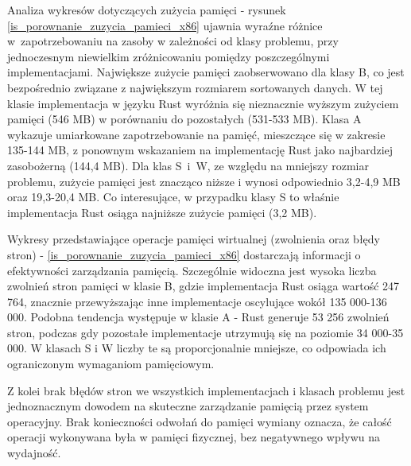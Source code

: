 Analiza wykresów dotyczących zużycia pamięci - rysunek \ref{is_porownanie_zuzycia_pamieci_x86} ujawnia wyraźne różnice w~zapotrzebowaniu na zasoby w zależności od klasy problemu, przy jednoczesnym niewielkim zróżnicowaniu pomiędzy poszczególnymi implementacjami. Największe zużycie pamięci zaobserwowano dla klasy B, co jest bezpośrednio związane z największym rozmiarem sortowanych danych. W tej klasie implementacja w języku Rust wyróżnia się nieznacznie wyższym zużyciem pamięci (546 MB) w porównaniu do pozostałych (531-533 MB). Klasa A wykazuje umiarkowane zapotrzebowanie na pamięć, mieszczące się w zakresie 135-144 MB, z ponownym wskazaniem na implementację Rust jako najbardziej zasobożerną (144,4 MB). Dla klas S~i~W, ze względu na mniejszy rozmiar problemu, zużycie pamięci jest znacząco niższe i wynosi odpowiednio 3,2-4,9 MB oraz 19,3-20,4 MB. Co interesujące, w przypadku klasy S to właśnie implementacja Rust osiąga najniższe zużycie pamięci (3,2 MB).

Wykresy przedstawiające operacje pamięci wirtualnej (zwolnienia oraz błędy stron) - \ref{is_porownanie_zuzycia_pamieci_x86} dostarczają informacji o efektywności zarządzania pamięcią. Szczególnie widoczna jest wysoka liczba zwolnień stron pamięci w klasie B, gdzie implementacja Rust osiąga wartość 247 764, znacznie przewyższając inne implementacje oscylujące wokół 135 000-136 000. Podobna tendencja występuje w klasie A - Rust generuje 53 256 zwolnień stron, podczas gdy pozostałe implementacje utrzymują się na poziomie 34 000-35 000. W klasach S i W liczby te są proporcjonalnie mniejsze, co odpowiada ich ograniczonym wymaganiom pamięciowym.

Z kolei brak błędów stron we wszystkich implementacjach i klasach problemu jest jednoznacznym dowodem na skuteczne zarządzanie pamięcią przez system operacyjny. Brak konieczności odwołań do pamięci wymiany oznacza, że całość operacji wykonywana była w pamięci fizycznej, bez negatywnego wpływu na wydajność.

